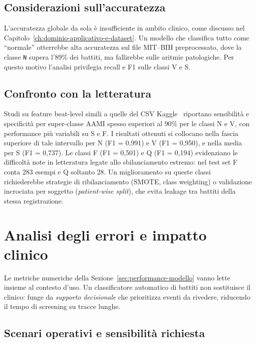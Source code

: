 \subsection{Considerazioni sull'accuratezza}

L'accuratezza globale da sola è insufficiente in ambito clinico, come discusso nel Capitolo~\ref{ch:dominio-applicativo-e-dataset}.
Un modello che classifica tutto come ``normale'' otterrebbe alta accuratezza sul file MIT--BIH preprocessato, dove la classe \texttt{N} supera l'89\% dei battiti, ma fallirebbe sulle aritmie patologiche.
Per questo motivo l'analisi privilegia recall e F1 sulle classi V e S.

\subsection{Confronto con la letteratura}

Studi su feature beat-level simili a quelle del CSV Kaggle~\cite{dechazal2004automatic,sakib2021edge} riportano sensibilità e specificità per super-classe AAMI spesso superiori al 90\% per le classi N e V, con performance più variabili su S e F.
I risultati ottenuti si collocano nella fascia superiore di tale intervallo per N (F1 = 0,991) e V (F1 = 0,950), e nella media per S (F1 = 0,737).
Le classi F (F1 = 0,501) e Q (F1 = 0,194) evidenziano le difficoltà note in letteratura legate allo sbilanciamento estremo: nel test set F conta 283 esempi e Q soltanto 28.
Un miglioramento su queste classi richiederebbe strategie di ribilanciamento (SMOTE, class weighting) o validazione incrociata per soggetto (\emph{patient-wise split}), che evita leakage tra battiti della stessa registrazione.

\section{Analisi degli errori e impatto clinico}\label{sec:analisi-errori}

Le metriche numeriche della Sezione~\ref{sec:performance-modello} vanno lette insieme al contesto d'uso.
Un classificatore automatico di battiti non sostituisce il clinico: funge da \emph{supporto decisionale} che prioritizza eventi da rivedere, riducendo il tempo di screening su tracce lunghe.

\subsection{Scenari operativi e sensibilità richiesta}

